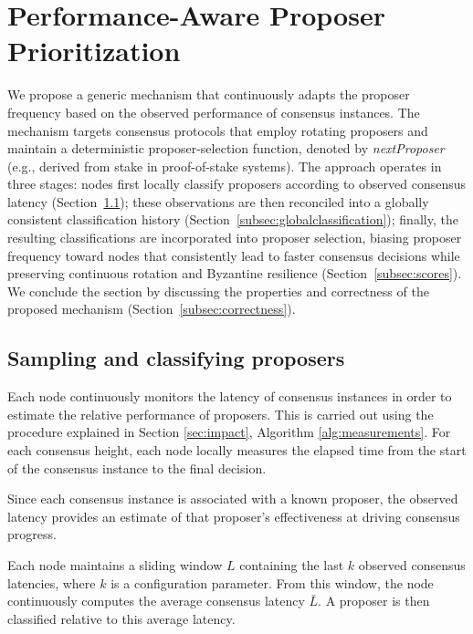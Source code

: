 \section{Performance-Aware Proposer Prioritization}
\label{sec:algorithm}

We propose a generic mechanism that continuously adapts the proposer frequency based on the observed performance of consensus instances. 
The mechanism targets consensus protocols that employ rotating proposers and maintain a deterministic proposer-selection function, denoted by \textit{nextProposer}
(e.g., derived from stake in proof-of-stake systems). 
The approach operates in three stages: nodes first locally classify proposers according to observed consensus latency (Section~\ref{subsec:samplig}); these observations are then reconciled into a globally consistent classification history (Section~\ref{subsec:globalclassification}); finally, the resulting classifications are incorporated into proposer selection, biasing proposer frequency toward nodes that consistently lead to faster consensus decisions while preserving continuous rotation and Byzantine resilience (Section~\ref{subsec:scores}).
We conclude the section by discussing the properties and correctness of the
proposed mechanism (Section~\ref{subsec:correctness}).

\subsection{Sampling and classifying proposers}
\label{subsec:samplig}

Each node continuously monitors the latency of consensus instances in order to estimate the relative performance of proposers. 
This is carried out using the procedure explained in Section \ref{sec:impact}, Algorithm \ref{alg:measurements}.
For each consensus height, each node locally measures the elapsed time from the start of the consensus instance 
to the final decision.

Since each consensus instance is associated with a known proposer, the observed latency provides an estimate of that proposer's effectiveness at driving consensus progress.

Each node maintains a sliding window $L$ containing the last $k$ observed consensus latencies, where $k$ is a configuration parameter. 
From this window, the node continuously computes the average consensus latency $\bar{L}$.
A proposer is then classified relative to this average latency. 

